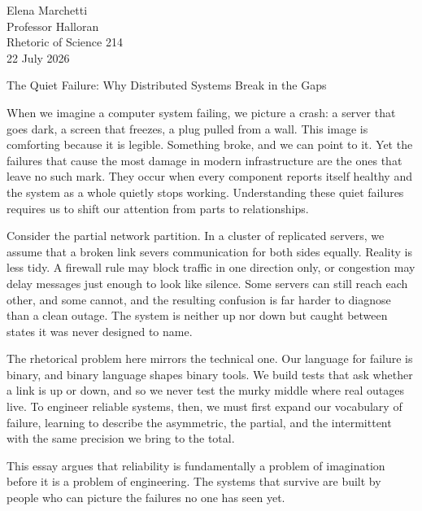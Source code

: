 \documentclass[12pt]{article}
\begin{document}
\begin{flushleft}
Elena Marchetti\\
Professor Halloran\\
Rhetoric of Science 214\\
22 July 2026
\end{flushleft}

\begin{center}
The Quiet Failure: Why Distributed Systems Break in the Gaps
\end{center}

When we imagine a computer system failing, we picture a crash: a server that
goes dark, a screen that freezes, a plug pulled from a wall. This image is
comforting because it is legible. Something broke, and we can point to it. Yet
the failures that cause the most damage in modern infrastructure are the ones
that leave no such mark. They occur when every component reports itself healthy
and the system as a whole quietly stops working. Understanding these quiet
failures requires us to shift our attention from parts to relationships.

Consider the partial network partition. In a cluster of replicated servers, we
assume that a broken link severs communication for both sides equally. Reality
is less tidy. A firewall rule may block traffic in one direction only, or
congestion may delay messages just enough to look like silence. Some servers can
still reach each other, and some cannot, and the resulting confusion is far
harder to diagnose than a clean outage. The system is neither up nor down but
caught between states it was never designed to name.

The rhetorical problem here mirrors the technical one. Our language for failure
is binary, and binary language shapes binary tools. We build tests that ask
whether a link is up or down, and so we never test the murky middle where real
outages live. To engineer reliable systems, then, we must first expand our
vocabulary of failure, learning to describe the asymmetric, the partial, and the
intermittent with the same precision we bring to the total.

This essay argues that reliability is fundamentally a problem of imagination
before it is a problem of engineering. The systems that survive are built by
people who can picture the failures no one has seen yet.
\end{document}
